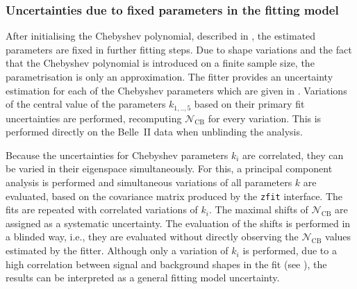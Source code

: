 \subsubsection{Uncertainties due to fixed parameters in the \texorpdfstring{\Mbc}{Mbc} fitting model}\label{sec:fitting_model_uncertainties}

After initialising the Chebyshev polynomial, described in , the estimated parameters are fixed in further fitting steps.
Due to shape variations and the fact that the Chebyshev polynomial is introduced on a finite sample size, the parametrisation is only an approximation.
The \Mbc fitter provides an uncertainty estimation for each of the Chebyshev \PDF parameters which are given in .
Variations of the central value of the parameters $k_{1,..,5}$ based on their primary fit uncertainties are performed, recomputing $\mathcal{N}_{\mathrm{CB}}$ for every variation.
This is performed directly on the Belle~II data when unblinding the analysis.

Because the uncertainties for Chebyshev parameters $k_i$ are correlated, they can be varied in their eigenspace simultaneously.
For this, a principal component analysis is performed and simultaneous variations of all parameters $k$ are evaluated, based on the covariance matrix produced by the \texttt{zfit} interface.
The \Mbc fits are repeated with correlated variations of $k_i$. 
The maximal shifts of $\mathcal{N}_{\mathrm{CB}}$ are assigned as a systematic uncertainty.
The evaluation of the shifts is performed in a blinded way, i.e., they are evaluated without directly observing the $\mathcal{N}_{\mathrm{CB}}$ values estimated by the fitter.
Although only a variation of $k_i$ is performed, 
due to a high correlation between signal and background \PDF shapes in the fit (see ),
the results can be interpreted as a general fitting model uncertainty.


